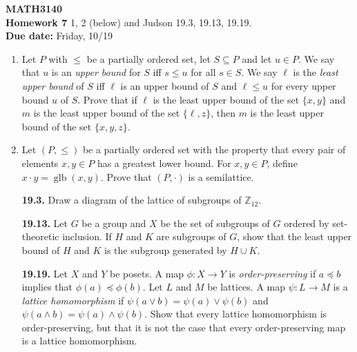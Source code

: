 \documentclass[12pt,reqno]{amsart}
\newcommand{\boldemph}{\emph}
\newcommand{\probskip}{\vskip1cm}
\newcommand{\subject}{MATH}
\newcommand{\coursenumber}{3140}
\begin{document}
\thispagestyle{empty}

\noindent \textbf{\subject \coursenumber}\\
{\bf Homework 7} 
\vskip1cm
 1, 2 (below) and Judson 19.3, 19.13, 19.19.\\
{\bf Due date:} Friday, 10/19

\bigskip

\begin{enumerate}[{\bf 1.}]

\item %
Let $P$ with $\leq$ be a partially ordered set, let $S \subseteq P$ and let
$u\in P$.  We say that $u$ is an \emph{upper bound} for $S$ iff $s\leq u$ for
all $s \in S$.  We say $\ell$ is the \emph{least upper bound} of $S$ iff $\ell$
is an upper bound of $S$ and $\ell \leq u$ for every upper bound $u$ of $S$.
Prove that if $\ell$ is the least upper bound of the set $\{x, y\}$ and $m$ is
the least upper bound of the set $\{\ell, z\}$, then $m$ is the least upper
bound of the set $\{x, y, z\}$.

\probskip

\item
Let $(P, \leq)$ be a partially ordered set with the property that every pair of
elements $x, y \in P$ has a greatest lower bound. For $x, y\in P$, define 
$x \cdot y = \operatorname{glb}(x,y)$. Prove that $(P, \cdot)$ is a semilattice.


\probskip
 
\item[{\bf 19.3.}] 
Draw a diagram of the lattice of subgroups of ${\mathbb Z}_{12}$.
 
 
\probskip

\item[{\bf 19.13.}] 
Let $G$ be a group and $X$ be the set of subgroups of $G$ ordered by
set-theoretic inclusion. If $H$ and $K$ are subgroups of $G$, show
that the least upper bound of $H$ and $K$ is the subgroup generated by
$H \cup K$. 
 
\probskip
 
\item[{\bf 19.19.}] 
Let $X$ and $Y$ be posets.  A map $\phi : X \rightarrow Y$ is \boldemph{
order-preserving} if $a \preceq b$
implies that $\phi(a) \preceq \phi(b)$.  Let $L$ and $M$ be lattices.
A map $\psi: L \rightarrow M$ is a \boldemph{lattice
homomorphism}
if $\psi( a \vee b ) = \psi(a) \vee \psi(b)$ and $\psi( a \wedge b ) =
\psi(a) \wedge \psi(b)$. Show that every lattice homomorphism is
order-preserving, but that it is not the case that every
order-preserving map is a lattice homomorphism.  
 
 
 
\end{enumerate}
\end{document}

